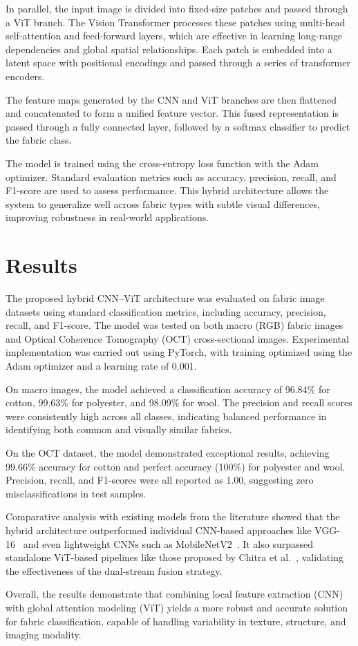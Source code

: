 In parallel, the input image is divided into fixed-size patches and passed through a ViT branch. The Vision Transformer processes these patches using multi-head self-attention and feed-forward layers, which are effective in learning long-range dependencies and global spatial relationships. Each patch is embedded into a latent space with positional encodings and passed through a series of transformer encoders.

The feature maps generated by the CNN and ViT branches are then flattened and concatenated to form a unified feature vector. This fused representation is passed through a fully connected layer, followed by a softmax classifier to predict the fabric class.

The model is trained using the cross-entropy loss function with the Adam optimizer. Standard evaluation metrics such as accuracy, precision, recall, and F1-score are used to assess performance. This hybrid architecture allows the system to generalize well across fabric types with subtle visual differences, improving robustness in real-world applications.

\section*{Results}

The proposed hybrid CNN–ViT architecture was evaluated on fabric image datasets using standard classification metrics, including accuracy, precision, recall, and F1-score. The model was tested on both macro (RGB) fabric images and Optical Coherence Tomography (OCT) cross-sectional images. Experimental implementation was carried out using PyTorch, with training optimized using the Adam optimizer and a learning rate of 0.001.

On macro images, the model achieved a classification accuracy of 96.84\% for cotton, 99.63\% for polyester, and 98.09\% for wool. The precision and recall scores were consistently high across all classes, indicating balanced performance in identifying both common and visually similar fabrics.

On the OCT dataset, the model demonstrated exceptional results, achieving 99.66\% accuracy for cotton and perfect accuracy (100\%) for polyester and wool. Precision, recall, and F1-scores were all reported as 1.00, suggesting zero misclassifications in test samples.

Comparative analysis with existing models from the literature showed that the hybrid architecture outperformed individual CNN-based approaches like VGG-16~\cite{hong2020cnn} and even lightweight CNNs such as MobileNetV2~\cite{siam2021textilenet}. It also surpassed standalone ViT-based pipelines like those proposed by Chitra et al.~\cite{chitra2022vit}, validating the effectiveness of the dual-stream fusion strategy.

Overall, the results demonstrate that combining local feature extraction (CNN) with global attention modeling (ViT) yields a more robust and accurate solution for fabric classification, capable of handling variability in texture, structure, and imaging modality.
